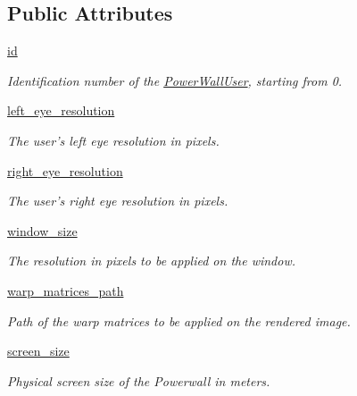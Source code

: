 \subsection*{\-Public \-Attributes}
\begin{DoxyCompactItemize}
\item 
\hyperlink{classlib_1_1PowerWallUser_1_1PowerWallUser_a5912e221e61c03533ce5367a27f2538b}{id}
\begin{DoxyCompactList}\small\item\em \-Identification number of the \hyperlink{classlib_1_1PowerWallUser_1_1PowerWallUser}{\-Power\-Wall\-User}, starting from 0. \end{DoxyCompactList}\item 
\hyperlink{classlib_1_1PowerWallUser_1_1PowerWallUser_a7ec3f6ee592c4f69a459248a2bb93c87}{left\-\_\-eye\-\_\-resolution}
\begin{DoxyCompactList}\small\item\em \-The user's left eye resolution in pixels. \end{DoxyCompactList}\item 
\hyperlink{classlib_1_1PowerWallUser_1_1PowerWallUser_a9f0eb47b7e3e5d3d060a425bc225a8a5}{right\-\_\-eye\-\_\-resolution}
\begin{DoxyCompactList}\small\item\em \-The user's right eye resolution in pixels. \end{DoxyCompactList}\item 
\hyperlink{classlib_1_1PowerWallUser_1_1PowerWallUser_acff959d7d5fc0e43505d2682e653f957}{window\-\_\-size}
\begin{DoxyCompactList}\small\item\em \-The resolution in pixels to be applied on the window. \end{DoxyCompactList}\item 
\hyperlink{classlib_1_1PowerWallUser_1_1PowerWallUser_aae55047b897b3daa9e76d97f08caf355}{warp\-\_\-matrices\-\_\-path}
\begin{DoxyCompactList}\small\item\em \-Path of the warp matrices to be applied on the rendered image. \end{DoxyCompactList}\item 
\hyperlink{classlib_1_1PowerWallUser_1_1PowerWallUser_a5f060b477ca50cadeddc36e75225acdc}{screen\-\_\-size}
\begin{DoxyCompactList}\small\item\em \-Physical screen size of the \-Powerwall in meters. \end{DoxyCompactList}\item 

\end{DoxyCompactItemize}
